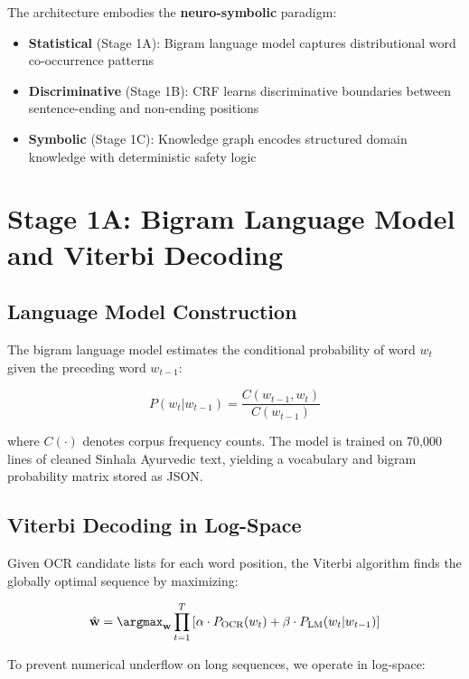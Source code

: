 \documentclass[12pt, a4paper, twoside]{report}
\begin{document}
The architecture embodies the \textbf{neuro-symbolic} paradigm:
\begin{itemize}
    \item \textbf{Statistical} (Stage 1A): Bigram language model captures distributional word co-occurrence patterns
    \item \textbf{Discriminative} (Stage 1B): CRF learns discriminative boundaries between sentence-ending and non-ending positions
    \item \textbf{Symbolic} (Stage 1C): Knowledge graph encodes structured domain knowledge with deterministic safety logic
\end{itemize}

\section{Stage 1A: Bigram Language Model and Viterbi Decoding}
\label{sec:viterbi}

\subsection{Language Model Construction}

The bigram language model estimates the conditional probability of word $w_t$ given the preceding word $w_{t-1}$:

\begin{equation}
P(w_t | w_{t-1}) = \frac{C(w_{t-1}, w_t)}{C(w_{t-1})}
\label{eq:bigram}
\end{equation}

where $C(\cdot)$ denotes corpus frequency counts. The model is trained on 70,000 lines of cleaned Sinhala Ayurvedic text, yielding a vocabulary and bigram probability matrix stored as JSON.

\subsection{Viterbi Decoding in Log-Space}

Given OCR candidate lists for each word position, the Viterbi algorithm finds the globally optimal sequence by maximizing:

\begin{equation}
\hat{\mathbf{w}} = \argmax_{\mathbf{w}} \prod_{t=1}^{T} \left[\alpha \cdot P_{\text{OCR}}(w_t) + \beta \cdot P_{\text{LM}}(w_t | w_{t-1})\right]
\label{eq:viterbi-objective}
\end{equation}

To prevent numerical underflow on long sequences, we operate in log-space:
\end{document}
